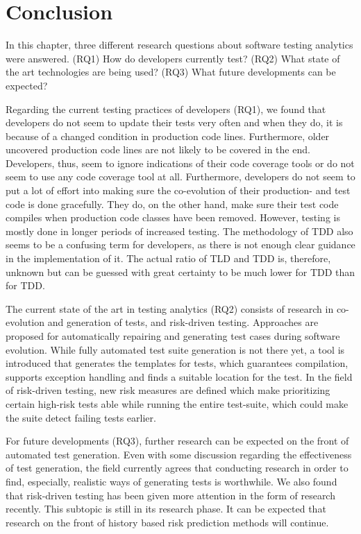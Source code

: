 \documentclass[]{book}
\begin{document}
\section{Conclusion}\label{conclusion}

In this chapter, three different research questions about software
testing analytics were answered. (RQ1) How do developers currently test?
(RQ2) What state of the art technologies are being used? (RQ3) What
future developments can be expected?

Regarding the current testing practices of developers (RQ1), we found
that developers do not seem to update their tests very often and when
they do, it is because of a changed condition in production code lines.
Furthermore, older uncovered production code lines are not likely to be
covered in the end. Developers, thus, seem to ignore indications of
their code coverage tools or do not seem to use any code coverage tool
at all. Furthermore, developers do not seem to put a lot of effort into
making sure the co-evolution of their production- and test code is done
gracefully. They do, on the other hand, make sure their test code
compiles when production code classes have been removed. However,
testing is mostly done in longer periods of increased testing. The
methodology of TDD also seems to be a confusing term for developers, as
there is not enough clear guidance in the implementation of it. The
actual ratio of TLD and TDD is, therefore, unknown but can be guessed
with great certainty to be much lower for TDD than for TDD.

The current state of the art in testing analytics (RQ2) consists of
research in co-evolution and generation of tests, and risk-driven
testing. Approaches are proposed for automatically repairing and
generating test cases during software evolution. While fully automated
test suite generation is not there yet, a tool is introduced that
generates the templates for tests, which guarantees compilation,
supports exception handling and finds a suitable location for the test.
In the field of risk-driven testing, new risk measures are defined which
make prioritizing certain high-risk tests able while running the entire
test-suite, which could make the suite detect failing tests earlier.

For future developments (RQ3), further research can be expected on the
front of automated test generation. Even with some discussion regarding
the effectiveness of test generation, the field currently agrees that
conducting research in order to find, especially, realistic ways of
generating tests is worthwhile. We also found that risk-driven testing
has been given more attention in the form of research recently. This
subtopic is still in its research phase. It can be expected that
research on the front of history based risk prediction methods will
continue.
\end{document}
